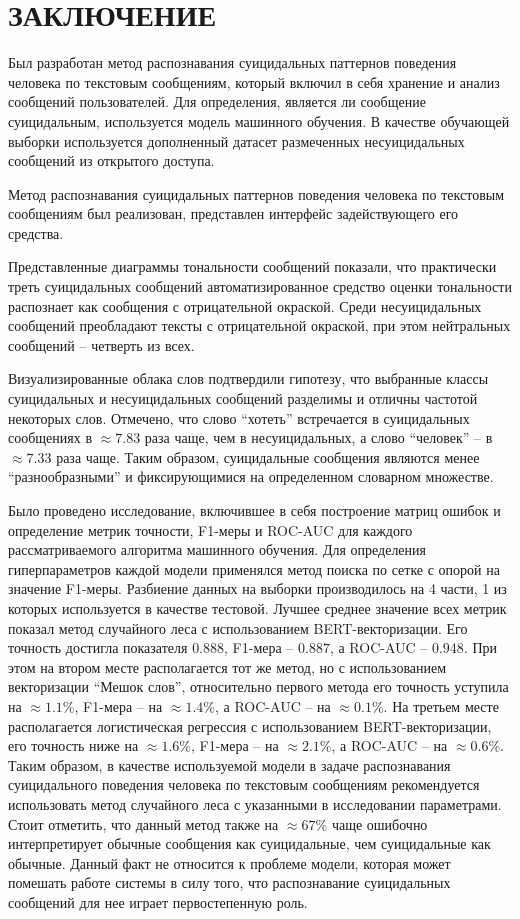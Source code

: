 \section*{ЗАКЛЮЧЕНИЕ}

Был разработан метод распознавания суицидальных паттернов поведения человека по текстовым сообщениям, который включил в себя хранение и анализ сообщений пользователей.
Для определения, является ли сообщение суицидальным, используется модель машинного обучения. В качестве обучающей выборки используется дополненный датасет размеченных несуицидальных сообщений из открытого доступа.

Метод распознавания суицидальных паттернов поведения человека по текстовым сообщениям был реализован, представлен интерфейс задействующего его средства.

Представленные диаграммы тональности сообщений показали, что практически треть суицидальных сообщений автоматизированное средство оценки тональности распознает как сообщения с отрицательной окраской. 
Среди несуицидальных сообщений преобладают тексты с отрицательной окраской, при этом нейтральных сообщений -- четверть из всех.

Визуализированные облака слов подтвердили гипотезу, что выбранные классы суицидальных и несуицидальных сообщений разделимы и отличны частотой некоторых слов. 
Отмечено, что слово ``хотеть'' встречается в суицидальных сообщениях в $\approx 7.83$ раза чаще, чем в несуицидальных, а слово ``человек'' -- в $\approx 7.33$ раза чаще. 
Таким образом, суицидальные сообщения являются менее ``разнообразными'' и фиксирующимися на определенном словарном множестве.

Было проведено исследование, включившее в себя построение матриц ошибок и определение метрик точности, F1-меры и ROC-AUC для каждого рассматриваемого алгоритма машинного обучения.
Для определения гиперпараметров каждой модели применялся метод поиска по сетке с опорой на значение F1-меры. Разбиение данных на выборки производилось на 4 части, 1 из которых используется в качестве тестовой.
Лучшее среднее значение всех метрик показал метод случайного леса с использованием BERT-векторизации.
Его точность достигла показателя $0.888$, F1-мера -- $0.887$, а ROC-AUC -- $0.948$.
При этом на втором месте располагается тот же метод, но с использованием векторизации ``Мешок слов'', относительно первого метода его точность уступила на $\approx 1.1\%$, F1-мера -- на $\approx 1.4\%$, а ROC-AUC -- на $\approx 0.1\%$. 
На третьем месте располагается логистическая регрессия с использованием BERT-векторизации, его точность ниже на $\approx 1.6\%$, F1-мера -- на $\approx 2.1\%$, а ROC-AUC -- на $\approx 0.6\%$. 
Таким образом, в качестве используемой модели в задаче распознавания суицидального поведения человека по текстовым сообщениям рекомендуется использовать метод случайного леса с указанными в исследовании параметрами.
Стоит отметить, что данный метод также на $\approx 67\%$ чаще ошибочно интерпретирует обычные сообщения как суицидальные, чем суицидальные как обычные. Данный факт не относится к проблеме модели, которая может помешать работе системы в силу того, что распознавание суицидальных сообщений для нее играет первостепенную роль.

\pagebreak
